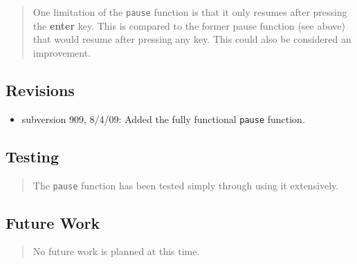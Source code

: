 \documentclass[10pt]{article}%
\begin{document}
\begin{quotation} One limitation of the \texttt{pause} function is that it only resumes after pressing the \textbf{enter} key. This is compared to the former pause function (see above) that would resume after pressing any key. This could also be considered an improvement.\end{quotation}

\subsection*{Revisions}

\begin{itemize}\item  subversion 909, 8/4/09: Added the fully functional \texttt{pause} function.
\end{itemize}

\subsection*{Testing}

\begin{quotation} The \texttt{pause} function has been tested simply through using it extensively.\end{quotation}

\subsection*{Future Work}

\begin{quotation} No future work is planned at this time.\end{quotation}
    

%
\end{document}

